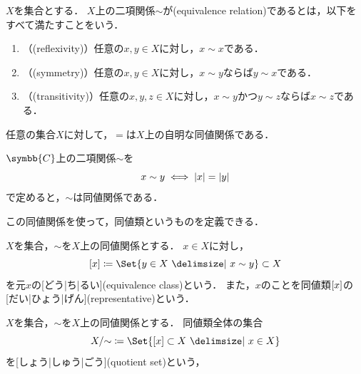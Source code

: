 \documentclass[../sotsu.tex]{subfiles}
\begin{document}
\begin{definition}[同値関係]
    \label{dfn:equivalence-relation}
    $X$を集合とする．
    $X$上の二項関係$\sim$が(equivalence relation)であるとは，以下をすべて満たすことをいう．
    \begin{enumerate}
        \item （(reflexivity)）任意の$x, y \in X$に対し，$x \sim x$である．
        \item （(symmetry)）任意の$x, y \in X$に対し，$x \sim y$ならば$y \sim x$である．
        \item （(transitivity)）任意の$x, y, z \in X$に対し，$x \sim y$かつ$y \sim z$ならば$x \sim z$である．
    \end{enumerate}
\end{definition}

\begin{example}
    任意の集合$X$に対して，$=$は$X$上の自明な同値関係である．
\end{example}

\begin{example}
    $\symbb{C}$上の二項関係$\sim$を
    \begin{equation*}
        x \sim y  \iff  \lvert x\rvert = \lvert y\rvert
    \end{equation*}
    で定めると，$\sim$は同値関係である．
\end{example}


この同値関係を使って，同値類というものを定義できる．

\begin{definition}[同値類]
    \label{dfn:equivalence-class}
    $X$を集合，$\sim$を$X$上の同値関係とする．
    $x \in X$に対し，
    \begin{equation}
        \eqclass{x}  \coloneq  \Set{ y \in X  \given  x \sim y } \subset X
    \end{equation}
    を元$x$の[どう|ち|るい](equivalence class)という．
    また，$x$のことを同値類$\lbrack x\rbrack$の[だい|ひょう|げん](representative)という．
\end{definition}

\begin{definition}[商集合]
    $X$を集合，$\sim$を$X$上の同値関係とする．
    同値類全体の集合
    \begin{equation}
        X/{\sim} \coloneq \Set{ \eqclass{x} \subset X  \given  x \in X }
    \end{equation}
    を[しょう|しゅう|ごう](quotient set)という，
\end{definition}
\end{document}
